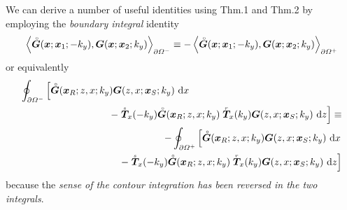 We can derive a number of useful identities using Thm.1 and Thm.2 by 
employing the {\em boundary integral\/} identity
\[
\left\langle{\stackrel{\scriptscriptstyle _{\,\,\circ}}{ \mbox{\boldmath$\mit G$\unboldmath}}}({\mbox{\boldmath$\mit x$\unboldmath}};{\mbox{\boldmath$\mit x$\unboldmath}}_{1};-k_y),{{\mbox{\boldmath$\mit G$\unboldmath}}}({\mbox{\boldmath$\mit x$\unboldmath}};{\mbox{\boldmath$\mit x$\unboldmath}}_{2};k_y)\right\rangle_{\partial{\mit 
\Omega}^{-}}\equiv
-\left\langle{\stackrel{\scriptscriptstyle _{\,\,\circ}}{ \mbox{\boldmath$\mit G$\unboldmath}}}({\mbox{\boldmath$\mit x$\unboldmath}};{\mbox{\boldmath$\mit x$\unboldmath}}_{1};-k_y),{{\mbox{\boldmath$\mit G$\unboldmath}}}({\mbox{\boldmath$\mit x$\unboldmath}};{\mbox{\boldmath$\mit x$\unboldmath}}_{2};k_y)\right\rangle_{\partial{\mit \Omega}^{+}}
\]
or equivalently
\begin{eqnarray} \label{bintid}
\lefteqn{
\oint_{\partial {\mit \Omega}^{-}} \left[ {\rf{\bmi G}}({\bmi x}_{R};{z, x};k_y) 
{{\bmi G}}({z, x};{\bmi x}_{S};k_y) \  {\rm d}x \right.}\nonumber\\
&&\qquad\qquad\qquad\qquad
\left.- \stackrel{\scriptscriptstyle _s}{\bmi T}{}_{\!\!\! x}(-k_y){\rf{\bmi 
G}}({\bmi x}_{R};{z, x};k_y)  
\stackrel{\scriptscriptstyle _r}{\bmi T}{}_{\!\!\! x}(k_y){{\bmi G}}({z, 
x};{\bmi x}_{S};k_y) \ {\rm d}z \right]\equiv\nonumber\\
&&
-\oint_{\partial {\mit \Omega}^{+}} \left[ {\rf{\bmi G}}({\bmi x}_{R};{z, x};k_y) 
{{\bmi G}}({z, x};{\bmi x}_{S};k_y) \  {\rm d}x \right.\nonumber\\
&&\qquad\qquad\qquad\qquad
\left.- \stackrel{\scriptscriptstyle _s}{\bmi T}{}_{\!\!\! x}(-k_y){\rf{\bmi 
G}}({\bmi x}_{R};{z, x};k_y)  
\stackrel{\scriptscriptstyle _r}{\bmi T}{}_{\!\!\! x}(k_y){{\bmi G}}({z, 
x};{\bmi x}_{S};k_y) \ {\rm d}z \right]
\end{eqnarray}
because the {\em sense of the contour integration has been reversed in 
the two integrals\/}.

